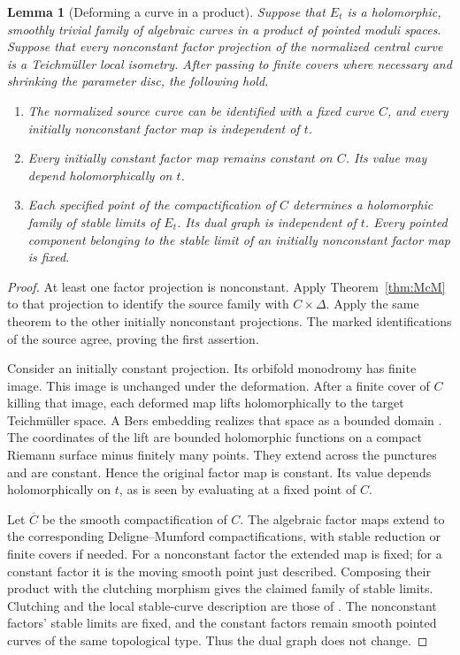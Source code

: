 \documentclass[11pt]{article}
\newcommand{\D}{\Delta}
\newcommand{\ol}[1]{\overline{#1}}
\newtheorem{lemma}[theorem]{Lemma}
\theoremstyle{remark}
\begin{document}
\begin{lemma}[Deforming a curve in a product]\label{lem:curve}
Suppose that \(E_t\) is a holomorphic, smoothly trivial family
of algebraic curves in a product of pointed moduli spaces.
Suppose that every nonconstant factor projection of the
normalized central curve is a Teichm\"uller local isometry.
After passing to finite covers where necessary and shrinking
the parameter disc, the following hold.
\begin{enumerate}
\item
The normalized source curve can be identified with a fixed curve
\(C\), and every initially nonconstant factor map is independent
of \(t\).

\item
Every initially constant factor map remains constant on \(C\).
Its value may depend holomorphically on \(t\).

\item
Each specified point of the compactification of \(C\) determines
a holomorphic family of stable limits of \(E_t\). Its dual graph
is independent of \(t\). Every pointed component belonging to
the stable limit of an initially nonconstant factor map is fixed.
\end{enumerate}
\end{lemma}

\begin{proof}
At least one factor projection is nonconstant. Apply
Theorem~\ref{thm:McM} to that projection to identify the source
family with \(C\times\D\). Apply the same theorem to the other
initially nonconstant projections. The marked identifications
of the source agree, proving the first assertion.

Consider an initially constant projection. Its orbifold
monodromy has finite image. This image is unchanged under the
deformation. After a finite cover of \(C\) killing that image,
each deformed map lifts holomorphically to the target
Teichm\"uller space. A Bers embedding realizes that space as
a bounded domain \cite{BersEmbedding}. The coordinates of the
lift are bounded holomorphic functions on a compact Riemann
surface minus finitely many points. They extend across the
punctures and are constant. Hence the original factor map is
constant. Its value depends holomorphically on \(t\), as is seen
by evaluating at a fixed point of \(C\).

Let \(\ol C\) be the smooth compactification of \(C\).
The algebraic factor maps extend to the corresponding
Deligne--Mumford compactifications, with stable reduction or
finite covers if needed. For a nonconstant factor the extended
map is fixed; for a constant factor it is the moving smooth
point just described. Composing their product with the
clutching morphism gives the claimed family of stable limits.
Clutching and the local stable-curve description are those of
\cite{DM}. The nonconstant factors' stable limits are fixed,
and the constant factors remain smooth pointed curves of the
same topological type. Thus the dual graph does not change.
\end{proof}
\end{document}
